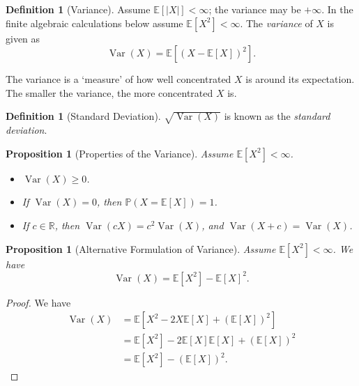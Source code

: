 \documentclass[11pt]{article}
\numberwithin{equation}{section}
\newtheorem{proposition}[theorem]{Proposition}
\theoremstyle{definition}
\newtheorem{definition}[theorem]{Definition}
\theoremstyle{remark}
\newcommand{\pqty}[1]{\left(#1\right)}
\newcommand{\bqty}[1]{\left[#1\right]}
\newcommand{\RR}{\mathbb R}
\newcommand{\Prob}{\mathbb P}
\newcommand{\Expt}{\mathbb E}
\DeclareMathOperator{\Var}{Var}
\begin{document}
\begin{definition}[Variance]\label{probability-definition-027}
    \label{probability-def:variance}%
Assume \(\Expt[|X|]<\infty\); the variance may be \(+\infty\). In the finite algebraic calculations below assume \(\Expt[X^2]<\infty\).
    The \emph{variance} of \(X\) is given as
    \[
        \Var\pqty{X} = \Expt\bqty{\pqty{X - \Expt\bqty{X}}^2}.
    \]
\end{definition}

The variance is a `measure' of how well concentrated \(X\) is around its expectation. The smaller the variance, the more concentrated \(X\) is.

\begin{definition}[Standard Deviation]\label{probability-definition-028}
    \label{probability-def:std-deviation}%
    \(\sqrt{\Var\pqty{X}}\) is known as the \emph{standard deviation}.
\end{definition}

\begin{proposition}[Properties of the Variance]\label{probability-proposition-010}
    \label{probability-prop:properties-of-variance}%
Assume \(\Expt[X^2]<\infty\).
    \begin{itemize}
        \item \(\Var\pqty{X} \geq 0\).
        \item If \(\Var\pqty{X} = 0\), then \(\Prob\pqty{X = \Expt\bqty{X}} = 1\).
        \item If \(c \in \RR\), then \(\Var\pqty{cX} = c^2 \Var\pqty{X}\), and \(\Var\pqty{X + c} = \Var\pqty{X}\).
    \end{itemize}
\end{proposition}

\begin{proposition}[Alternative Formulation of Variance]\label{probability-proposition-011}
    \label{probability-prop:alt-formulation}%
Assume \(\Expt[X^2]<\infty\).
    We have
    \[
        \Var\pqty{X} = \Expt\bqty{X^2} - \Expt\bqty{X}^2.
    \]
\end{proposition}

\begin{proof}\label{probability-proof-021}
    We have
    \begin{align*}
        \Var\pqty{X} &= \Expt\bqty{X^2 - 2X \Expt\bqty{X} + \pqty{\Expt\bqty{X}}^2} \\
        &= \Expt\bqty{X^2} - 2 \Expt\bqty{X} \Expt\bqty{X} + \pqty{\Expt\bqty{X}}^2 \\
        &= \Expt\bqty{X^2} - \pqty{\Expt\bqty{X}}^2.
    \end{align*}
\end{proof}
\end{document}
